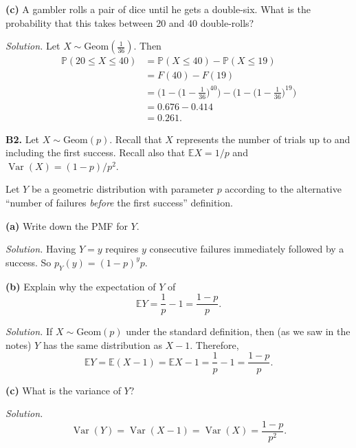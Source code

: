\documentclass[
  a4paper,
]{book}
\theoremstyle{definition}
\theoremstyle{definition}
\theoremstyle{definition}
\theoremstyle{definition}
\theoremstyle{remark}
\begin{document}
\textbf{(c)} A gambler rolls a pair of dice until he gets a double-six. What is the probability that this takes between 20 and 40 double-rolls?

\begin{myanswers}
\emph{Solution.}
Let \(X \sim \text{Geom}(\frac{1}{36})\). Then
\begin{align*}
\mathbb P(20 \leq X \leq 40) &= \mathbb P(X \leq 40) - \mathbb P(X \leq 19) \\
  &= F(40) - F(19) \\
  &= \bigg(1 - \big(1 - \tfrac{1}{36})^{40}\bigg) - \bigg(1 - \big(1 - \tfrac{1}{36})^{19}\bigg) \\
  &= 0.676 - 0.414 \\
  &= 0.261.
\end{align*}

\end{myanswers}

\textbf{B2.} Let \(X \sim \text{Geom}(p)\). Recall that \(X\) represents the number of trials up to and including the first success. Recall also that \(\mathbb EX = 1/p\) and \(\operatorname{Var}(X) = (1-p)/p^2\).

Let \(Y\) be a geometric distribution with parameter \(p\) according to the alternative ``number of failures \emph{before} the first success'' definition.

\textbf{(a)} Write down the PMF for \(Y\).

\begin{myanswers}
\emph{Solution.} Having \(Y = y\) requires \(y\) consecutive failures immediately followed by a success. So \(p_Y(y) = (1-p)^y p\).

\end{myanswers}

\textbf{(b)} Explain why the expectation of \(Y\) of
\[ \mathbb EY = \frac{1}{p} - 1 = \frac{1-p}{p} . \]

\begin{myanswers}
\emph{Solution.} If \(X \sim \text{Geom}(p)\) under the standard definition, then (as we saw in the notes) \(Y\) has the same distribution as \(X -1\). Therefore,
\[ \mathbb EY = \mathbb E(X-1) = \mathbb EX - 1 = \frac{1}{p} - 1 = \frac{1-p}{p} . \]

\end{myanswers}

\textbf{(c)} What is the variance of \(Y\)?

\begin{myanswers}
\emph{Solution.}
\[ \operatorname{Var}(Y) = \operatorname{Var}(X -1) = \operatorname{Var}(X) = \frac{1-p}{p^2} .  \]

\end{myanswers}
\end{document}
